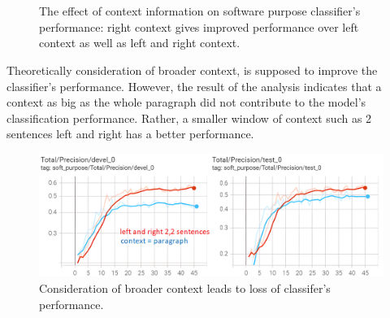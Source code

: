 \begin{figure}[h]
	
	\myfloatalign
	
	 \\
	\\
	\caption[Subfloat - Figure]{The effect of context information on software purpose classifier's performance: right context gives improved performance over left context as well as left and right context.}
\end{figure}

Theoretically consideration of broader context, is supposed to improve the classifier’s performance. However, the result of the analysis indicates that a context as big as the whole paragraph did not contribute to the model’s classification performance. Rather, a smaller window of context such as 2 sentences left and right has a better performance. 

\begin{figure}[htbp]
	\centering
	\includegraphics[width=.90\textwidth]{4.graphics/figures/ch_6/3.paragraph_context_vs_22/HD/1}
	\caption{Consideration of broader context leads to loss of classifer's performance.}
	\label{fig:chapter06:with}
\end{figure}


